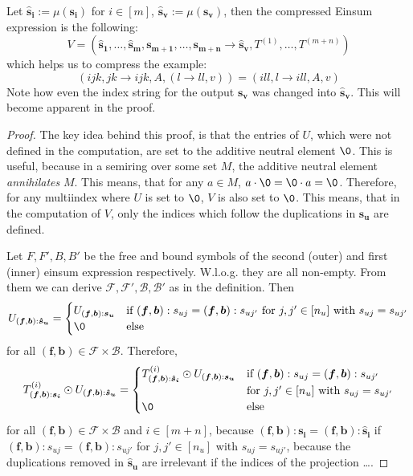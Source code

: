 \begin{theorem}
    Let $\bm{\hat{s}_i} := \mu(\bm{s_i})$ for $i \in [m]$, $\bm{\hat{s}_v} := \mu(\bm{s_v})$, then the compressed Einsum expression is the following:
    $$V = (\bm{\hat{s}_1},\dots,\bm{\hat{s}_m}, \bm{s_{m + 1}}, \dots, \bm{s_{m + n}} \rightarrow \bm{\hat{s}_v}, T^{(1)},\dots,T^{(m + n)})$$
    which helps us to compress the example:
    $$(ijk, jk \rightarrow ijk, A, (l \rightarrow ll, v)) = (ill, l \rightarrow ill, A, v)$$
    Note how even the index string for the output $\bm{s_v}$ was changed into $\bm{\hat{s}_v}$.
    This will become apparent in the proof.
\end{theorem}

\begin{proof}
    \small
    The key idea behind this proof, is that the entries of $U$, which were not defined in the computation, are set to the additive neutral element $\0$.
    This is useful, because in a semiring over some set $M$, the additive neutral element \textit{annihilates} $M$.
    This means, that for any $a \in M$, $a \cdot \0 = \0 \cdot a = \0$.
    Therefore, for any multiindex where $U$ is set to $\0$, $V$ is also set to $\0$.
    This means, that in the computation of $V$, only the indices which follow the duplications in $\bm{s_u}$ are defined.

    Let $F, F', B, B'$ be the free and bound symbols of the second (outer) and first (inner) einsum expression respectively.
    W.l.o.g. they are all non-empty.
    From them we can derive $\mathcal{F}, \mathcal{F}', \mathcal{B}, \mathcal{B}'$ as in the definition.
    Then
    $$U_{(\bm{f}, \bm{b}): \bm{\hat{s}_u}} = \begin{cases}
            U_{(\bm{f}, \bm{b}): \bm{s_u}} & \text{if } (\bm{f}, \bm{b}):s_{uj} = (\bm{f}, \bm{b}):s_{uj'} \text{ for } j,j' \in [n_u] \text{ with } s_{uj} = s_{uj'} \\
            \0                             & \text{else}
        \end{cases}$$
    for all $(\bm{f}, \bm{b}) \in \mathcal{F} \times \mathcal{B}$.
    Therefore,
    $$T^{(i)}_{(\bm{f}, \bm{b}): \bm{s_i}} \odot U_{(\bm{f}, \bm{b}): \bm{\hat{s}_u}} = \begin{cases}
            T^{(i)}_{(\bm{f}, \bm{b}): \bm{\hat{s}_i}} \odot U_{(\bm{f}, \bm{b}): \bm{s_u}} & \text{if } (\bm{f}, \bm{b}):s_{uj} = (\bm{f}, \bm{b}):s_{uj'} \\
                                                                                            & \text{for } j,j' \in [n_u] \text{ with } s_{uj} = s_{uj'}     \\
            \0                                                                              & \text{else}
        \end{cases}$$
    for all $(\bm{f}, \bm{b}) \in \mathcal{F} \times \mathcal{B}$ and $i \in [m + n]$,
    because $(\bm{f}, \bm{b}): \bm{s_i} = (\bm{f}, \bm{b}): \bm{\hat{s}_i}$ if $(\bm{f}, \bm{b}):s_{uj} = (\bm{f}, \bm{b}):s_{uj'}$ for $j,j' \in [n_u]$ with $s_{uj} = s_{uj'}$,
    because the duplications removed in $\bm{\hat{s}_u}$ are irrelevant if the indices of the projection \dots.


\end{proof}
